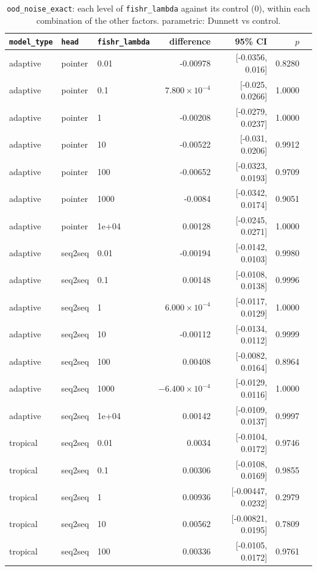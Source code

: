 \documentclass[10pt]{article}
\begin{document}
{\small
\begin{longtable}{lllrrrl}
\caption{\texttt{ood\_noise\_exact}: each level of \texttt{fishr\_lambda} against its control (0), within each combination of the other factors. parametric: Dunnett vs control.}\label{tab:control-ood_noise_exact}\\
\toprule
\texttt{model\_type} & \texttt{head} & \texttt{fishr\_lambda} & difference & 95\% CI & $p$ & \\
\midrule
\endhead
adaptive & pointer & 0.01 & -0.00978 & [-0.0356, 0.016] & 0.8280 & \\
adaptive & pointer & 0.1 & $7.800\times10^{-4}$ & [-0.025, 0.0266] & 1.0000 & \\
adaptive & pointer & 1 & -0.00208 & [-0.0279, 0.0237] & 1.0000 & \\
adaptive & pointer & 10 & -0.00522 & [-0.031, 0.0206] & 0.9912 & \\
adaptive & pointer & 100 & -0.00652 & [-0.0323, 0.0193] & 0.9709 & \\
adaptive & pointer & 1000 & -0.0084 & [-0.0342, 0.0174] & 0.9051 & \\
adaptive & pointer & 1e+04 & 0.00128 & [-0.0245, 0.0271] & 1.0000 & \\
adaptive & seq2seq & 0.01 & -0.00194 & [-0.0142, 0.0103] & 0.9980 & \\
adaptive & seq2seq & 0.1 & 0.00148 & [-0.0108, 0.0138] & 0.9996 & \\
adaptive & seq2seq & 1 & $6.000\times10^{-4}$ & [-0.0117, 0.0129] & 1.0000 & \\
adaptive & seq2seq & 10 & -0.00112 & [-0.0134, 0.0112] & 0.9999 & \\
adaptive & seq2seq & 100 & 0.00408 & [-0.0082, 0.0164] & 0.8964 & \\
adaptive & seq2seq & 1000 & $-6.400\times10^{-4}$ & [-0.0129, 0.0116] & 1.0000 & \\
adaptive & seq2seq & 1e+04 & 0.00142 & [-0.0109, 0.0137] & 0.9997 & \\
tropical & seq2seq & 0.01 & 0.0034 & [-0.0104, 0.0172] & 0.9746 & \\
tropical & seq2seq & 0.1 & 0.00306 & [-0.0108, 0.0169] & 0.9855 & \\
tropical & seq2seq & 1 & 0.00936 & [-0.00447, 0.0232] & 0.2979 & \\
tropical & seq2seq & 10 & 0.00562 & [-0.00821, 0.0195] & 0.7809 & \\
tropical & seq2seq & 100 & 0.00336 & [-0.0105, 0.0172] & 0.9761 & \\

\end{longtable}}
\end{document}
